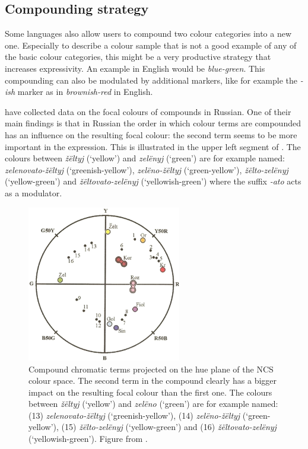 \subsection{Compounding strategy}

Some languages also allow users to compound two colour categories into
a new one. Especially to describe a colour sample that is not a good
example of any of the basic colour categories, this might be a very
productive strategy that increases expressivity. An example in English
would be \textit{blue-green}. This compounding can also be modulated by
additional markers, like for example the \textit{-ish} marker as in
\textit{brownish-red} in English.

\cite{safuanova07russian} have collected data on the focal colours of
compounds in Russian. One of their main findings is that in Russian
the order in which colour terms are compounded has an influence on
the resulting focal colour: the second term seems to be more important
in the expression. This is illustrated in the upper left segment of
. The colours between \textit{\v
z\"eltyj} (`yellow') and \textit{zel\"enyj} (`green') are for example named:
\textit{zelenovato-\v z\"eltyj} (`greenish-yellow'), \textit{zel\"eno-\v z\"eltyj}
(`green-yellow'), \textit{\v z\"elto-zel\"enyj} (`yellow-green') and \textit{\v
z\"eltovato-zel\"enyj} (`yellowish-green') where the suffix \textit{-ato}
acts as a modulator.

\begin{figure}[htbp]
  \begin{center}
   \includegraphics[width=0.6\textwidth]{./intro/figures/category-combination.pdf}
   \caption[Compound chromatic terms in Russian]{Compound chromatic
     terms projected on the hue plane of the NCS colour space. The
     second term in the compound clearly has a bigger impact on the
     resulting focal colour than the first one. The colours between
     \textit{\v z\"eltyj} (`yellow') and \textit{zel\"eno} (`green') are for example
     named: (13) \textit{zelenovato-\v z\"eltyj} (`greenish-yellow'), (14)
     \textit{zel\"eno-\v z\"eltyj} (`green-yellow'), (15) \textit{\v
     z\"elto-zel\"enyj} (`yellow-green') and (16) \textit{\v
     z\"eltovato-zel\"enyj} (`yellowish-green'). Figure from
     \cite{safuanova07russian}.}
    \label{f:category-combination}
  \end{center}
\end{figure}

